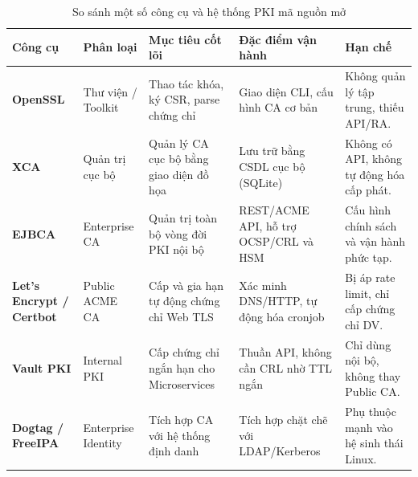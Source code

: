 \begin{table}[htbp]
    \centering
    \small
    \renewcommand{\arraystretch}{1.4}
    \caption{So sánh một số công cụ và hệ thống PKI mã nguồn mở}
    \label{tab:opensource-pki-tools}
    \begin{tabular}{@{} >{\raggedright\arraybackslash}p{} >{\raggedright\arraybackslash}p{} >{\raggedright\arraybackslash}p{} >{\raggedright\arraybackslash}p{} >{\raggedright\arraybackslash}p{} @{}}
        \toprule
        \textbf{Công cụ} & \textbf{Phân loại} & \textbf{Mục tiêu cốt lõi} & \textbf{Đặc điểm vận hành} & \textbf{Hạn chế} \\
        \midrule
        \textbf{OpenSSL} & Thư viện / Toolkit & Thao tác khóa, ký CSR, parse chứng chỉ & Giao diện CLI, cấu hình CA cơ bản & Không quản lý tập trung, thiếu API/RA. \\
        \textbf{XCA} & Quản trị cục bộ & Quản lý CA cục bộ bằng giao diện đồ họa & Lưu trữ bằng CSDL cục bộ (SQLite) & Không có API, không tự động hóa cấp phát. \\
        \textbf{EJBCA} & Enterprise CA & Quản trị toàn bộ vòng đời PKI nội bộ & REST/ACME API, hỗ trợ OCSP/CRL và HSM & Cấu hình chính sách và vận hành phức tạp. \\
        \textbf{Let's Encrypt / Certbot} & Public ACME CA & Cấp và gia hạn tự động chứng chỉ Web TLS & Xác minh DNS/HTTP, tự động hóa cronjob & Bị áp rate limit, chỉ cấp chứng chỉ DV. \\
        \textbf{Vault PKI} & Internal PKI & Cấp chứng chỉ ngắn hạn cho Microservices & Thuần API, không cần CRL nhờ TTL ngắn & Chỉ dùng nội bộ, không thay Public CA. \\
        \textbf{Dogtag / FreeIPA} & Enterprise Identity & Tích hợp CA với hệ thống định danh & Tích hợp chặt chẽ với LDAP/Kerberos & Phụ thuộc mạnh vào hệ sinh thái Linux. \\
        \bottomrule
    \end{tabular}
\end{table}

